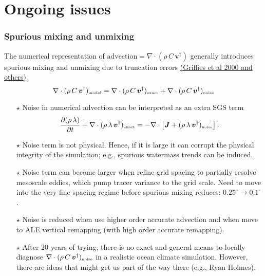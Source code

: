 \documentclass[10pt]{beamer}
\begin{document}
\section{Ongoing issues}

\begin{frame}
  \frametitle{Spurious mixing and unmixing}

  The numerical representation of
  $\mbox{advection} = \nabla \cdot ( \rho \, C \, {\bm v}^{\dagger})$
  generally introduces spurious mixing and unmixing due to truncation
  errors
  \href{https://doi.org/10.1175/1520-0493(2000)128<0538:SDMAWA>2.0.CO;2}{(Griffies
    et al 2000 and others)}
\begin{equation}
   \nabla \cdot ( \rho \, C \, {\bm v}^{\dagger})_{\mbox{\tiny model}} = 
   \nabla \cdot ( \rho \, C \, {\bm v}^{\dagger})_{\mbox{\tiny exact}} 
  +
 \nabla \cdot ( \rho \, C \, {\bm v}^{\dagger})_{\mbox{\tiny noise}}
\end{equation}

\begin{exampleblock}{}
\begin{itemize}
\item[$\star$] Noise in numerical advection can be interpreted as an
  extra SGS term
\begin{equation}
   \frac{\partial (\rho \, \lambda)}{\partial t} + \nabla \cdot (\rho \, \lambda \, {\bm v}^{\dagger} )_{\mbox{\tiny exact}} 
 = -\nabla \cdot \left[  {\bm J} + (\rho \, \lambda \, {\bm v}^{\dagger} )_{\mbox{\tiny noise}} \right]. 
\end{equation}

\item[$\star$] Noise term is not physical.  Hence, if it is large it
  can corrupt the physical integrity of the simulation; e.g.,
  spurious watermass trends can be induced.

\item[$\star$] Noise term can become larger when refine grid spacing
  to partially resolve mesoscale eddies, which pump tracer variance to
  the grid scale.  Need to move into the very fine spacing regime
  before spurious mixing reduces:
  $0.25^{\circ} \longrightarrow 0.1^{\circ}$.

\item[$\star$] Noise is reduced when use higher order accurate
  advection and when move to ALE vertical remapping (with high order
  accurate remapping). 

\item[$\star$] After 20 years of trying, there is no exact and general
  means to locally diagnose
  $\nabla \cdot ( \rho \, C \, {\bm v}^{\dagger})_{\mbox{\tiny
      noise}}$
  in a realistic ocean climate simulation.  However, there are ideas
  that might get us part of the way there (e.g., Ryan Holmes).

\end{itemize}
\end{exampleblock}{}


\end{frame}
\end{document}
